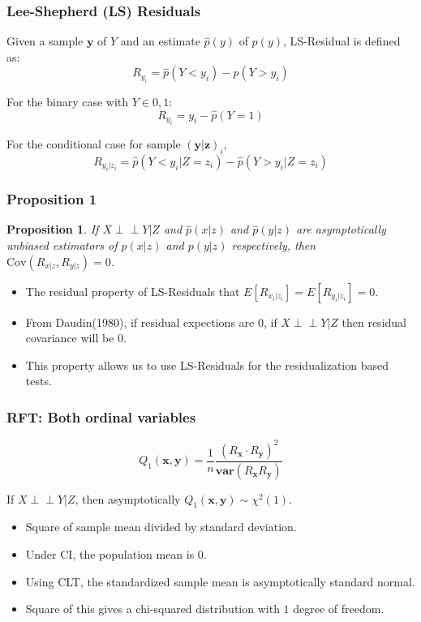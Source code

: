 \documentclass{beamer}
\def\ci{\perp\!\!\!\!\!\perp}
\newtheorem{proposition}{Proposition}
\begin{document}
\begin{frame}
	\frametitle{Lee-Shepherd (LS) Residuals}
	Given a sample $ \bm{y} $ of $ Y $ and an estimate $ \hat{p}(y) $ of $ p(y) $,
	LS-Residual is defined as:
	$$ R_{y_i} = \hat{p}(Y < y_i) - \hat{p}(Y > y_i) $$
	\vspace{1em}

	For the binary case with $ Y \in {0, 1} $:
	$$ R_{y_i} = y_i - \hat{p}(Y = 1) $$
	\vspace{1em}

	For the conditional case for sample $ (\bm{y}|\bm{z})_i $,
	$$ R_{y_i | z_i} = \hat{p}(Y < y_i | Z=z_i) - \hat{p}(Y>y_i|Z=z_i) $$

\end{frame}

\begin{frame}
	\frametitle{Proposition 1}
	\begin{proposition}
	If $ X \ci Y | Z $ and $ \hat{p}(x|z) $ and $ \hat{p}(y|z) $ are asymptotically
	unbiased estimators of $ p(x|z) $ and $ p(y|z) $ respectively, then 
	$ \mathrm{Cov}(R_{x|z}, R_{y|z}) = 0 $.	
	\end{proposition}
	\vspace{1em}

	\begin{itemize}
		\item The residual property of LS-Residuals that $
			E[R_{x_i|z_i}] = E[R_{y_i|z_i}] = 0 $.
		\item From Daudin(1980), if residual expections are $ 0 $, if $
			X \ci Y | Z $ then residual covariance will be $ 0 $.
		\item This property allows us to use LS-Residuals for the residualization
			based tests.
	\end{itemize}
\end{frame}

\begin{frame}
	\frametitle{RFT: Both ordinal variables}
	$$ Q_1(\bm{x}, \bm{y}) = \frac{1}{n} \frac{(R_{\bm{x}} \cdot R_{\bm{y}})^2}{\bm{var}(R_{\bm{x}} R_{\bm{y}})} $$

	If $ X \ci Y | Z $, then asymptotically $ Q_1(\bm{x}, \bm{y}) \sim \chi^2(1) $.

	\begin{itemize}
		\item Square of sample mean divided by standard deviation.
		\item Under CI, the population mean is 0.
		\item Using CLT, the standardized sample mean is asymptotically
			standard normal.
		\item Square of this gives a chi-squared distribution with $ 1
			$ degree of freedom.
	\end{itemize}
\end{frame}
\end{document}
